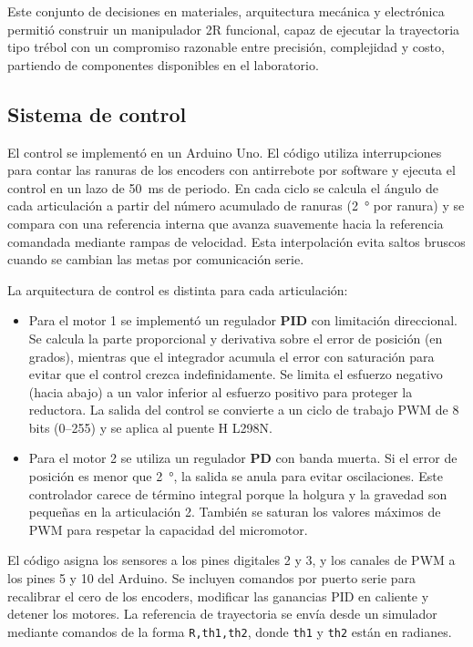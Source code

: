 \documentclass[11pt,a4paper]{article}
\begin{document}
Este conjunto de decisiones en materiales, arquitectura mecánica y electrónica permitió construir un manipulador 2R funcional, capaz de ejecutar la trayectoria tipo trébol con un compromiso razonable entre precisión, complejidad y costo, partiendo de componentes disponibles en el laboratorio.




\subsection{Sistema de control}

El control se implementó en un Arduino Uno.  El código utiliza interrupciones para contar las ranuras de los encoders con antirrebote por software y ejecuta el control en un lazo de \SI{50}{\milli\second} de periodo.  En cada ciclo se calcula el ángulo de cada articulación a partir del número acumulado de ranuras (\SI{2}{\degree} por ranura) y se compara con una referencia interna que avanza suavemente hacia la referencia comandada mediante rampas de velocidad.  Esta interpolación evita saltos bruscos cuando se cambian las metas por comunicación serie.

La arquitectura de control es distinta para cada articulación:
\begin{itemize}
  \item Para el motor 1 se implementó un regulador \textbf{PID} con limitación direccional.  Se calcula la parte proporcional y derivativa sobre el error de posición (en grados), mientras que el integrador acumula el error con saturación para evitar que el control crezca indefinidamente.  Se limita el esfuerzo negativo (hacia abajo) a un valor inferior al esfuerzo positivo para proteger la reductora.  La salida del control se convierte a un ciclo de trabajo PWM de 8 bits (0–255) y se aplica al puente H L298N.
  \item Para el motor 2 se utiliza un regulador \textbf{PD} con banda muerta.  Si el error de posición es menor que \SI{2}{\degree}, la salida se anula para evitar oscilaciones.  Este controlador carece de término integral porque la holgura y la gravedad son pequeñas en la articulación 2.  También se saturan los valores máximos de PWM para respetar la capacidad del micromotor.
\end{itemize}

El código asigna los sensores a los pines digitales 2 y 3, y los canales de PWM a los pines 5 y 10 del Arduino.  Se incluyen comandos por puerto serie para recalibrar el cero de los encoders, modificar las ganancias PID en caliente y detener los motores.  La referencia de trayectoria se envía desde un simulador mediante comandos de la forma \texttt{R,th1,th2}, donde \texttt{th1} y \texttt{th2} están en radianes.
\end{document}
